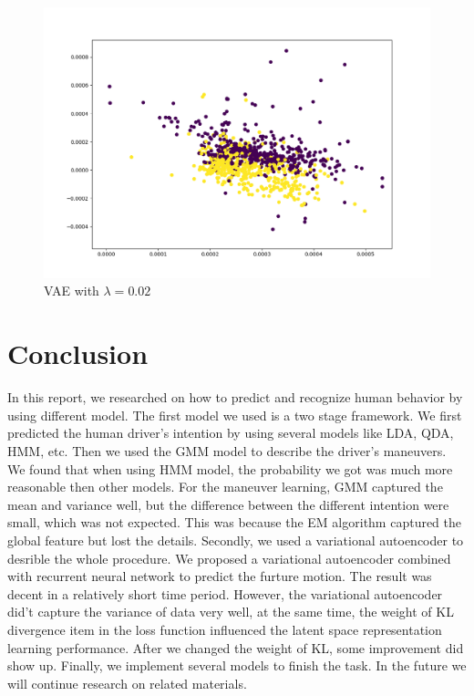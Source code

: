 \documentclass[conference]{IEEEtran}
\begin{document}
\begin{figure}[h]
	\centering
	\includegraphics[scale = 0.3]{vae_z_1.png}
	\caption{VAE with $\lambda=0.02$}
	\label{fig:vae0.02}
\end{figure}


\section{Conclusion}
 In this report, we researched on how to predict and recognize human behavior by using different model. The first model we used is a two stage framework. We first predicted the human driver's intention by using several models like LDA, QDA, HMM, etc. Then we used the GMM model to describe the driver's maneuvers. We found that when using HMM model, the probability we got was much more reasonable then other models. For the maneuver learning, GMM captured the mean and variance well, but the difference between the different intention were small, which was not expected. This was because the EM algorithm captured the global feature but lost the details. Secondly, we used a variational autoencoder to desrible the whole procedure. We proposed a variational autoencoder combined with recurrent neural network to predict the furture motion. The result was decent in a relatively short time period. However, the variational autoencoder did't capture the variance of data very well, at the same time, the weight of KL divergence item in the loss function influenced the latent space representation learning performance. After we changed the weight of KL,  some improvement did show up. Finally, we implement several models to finish the task. In the future we will continue research on related materials.



\end{document}
